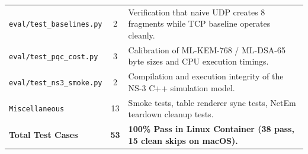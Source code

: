 \begin{table}[htbp]
\begin{tabularx}{\textwidth}{>{\raggedright\arraybackslash}p{4.2cm} c >{\raggedright\arraybackslash}X}
        \texttt{eval/test\_baselines.py} & 2 & Verification that naive UDP creates 8 fragments while TCP baseline operates cleanly. \\
        \texttt{eval/test\_pqc\_cost.py} & 3 & Calibration of ML-KEM-768 / ML-DSA-65 byte sizes and CPU execution timings. \\
        \texttt{eval/test\_ns3\_smoke.py} & 2 & Compilation and execution integrity of the NS-3 C++ simulation model. \\
        \texttt{Miscellaneous} & 13 & Smoke tests, table renderer sync tests, NetEm teardown cleanup tests. \\
        \midrule
        \textbf{Total Test Cases} & \textbf{53} & \textbf{100\% Pass in Linux Container (38 pass, 15 clean skips on macOS).} \\
        \bottomrule
    \end{tabularx}
\end{table}

